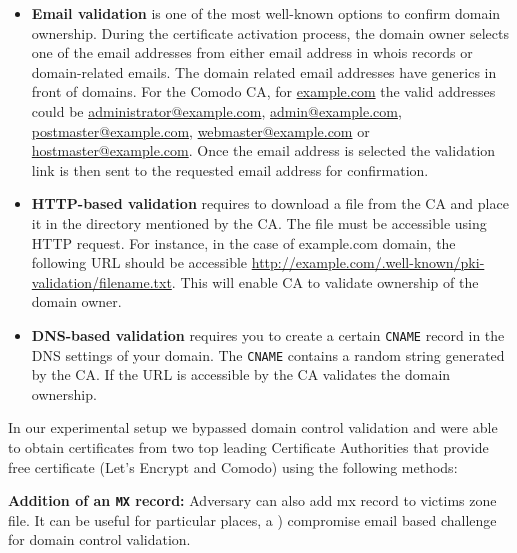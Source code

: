 \begin{itemize}
    \item \textbf {Email validation} is one of the most well-known options to confirm domain ownership. 
    During the certificate activation process, the domain owner selects one of the email addresses from either email address in whois records or domain-related emails. 
    The domain related email addresses have generics in front of domains.
    For the Comodo CA, for \url{example.com} the valid addresses could be  \url{administrator@example.com}, \url{admin@example.com}, 
    \url{postmaster@example.com}, \url{webmaster@example.com} or \url{hostmaster@example.com}. 
    Once the email address is selected the validation link is then sent to the requested email address for confirmation.
    
    \item \textbf{HTTP-based validation} requires to download a file from the CA and place it in the directory mentioned by the CA. The file must be accessible using HTTP request. For instance, in the case of example.com domain, the following URL should be accessible \url{http://example.com/.well-known/pki-validation/filename.txt}. This will enable CA to validate ownership of the domain owner.

    \item \textbf{DNS-based validation} requires you to create a certain \texttt{CNAME} record in the DNS settings of your domain. The \texttt{CNAME} contains a random string generated by the CA. If the URL is accessible by the CA validates the domain ownership. 
\end{itemize}

In our experimental setup we %
bypassed domain control validation and were able to obtain certificates from two top leading Certificate Authorities that provide free certificate (Let's Encrypt and Comodo) using the following methods:



\textbf{ Addition of an \texttt{MX} record:} 
Adversary can also add mx record to victims zone file. It can be useful for particular places, a ) compromise email based challenge for domain control validation. %


